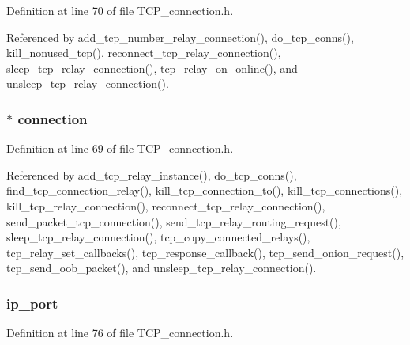 Definition at line 70 of file T\+C\+P\+\_\+connection.\+h.



Referenced by add\+\_\+tcp\+\_\+number\+\_\+relay\+\_\+connection(), do\+\_\+tcp\+\_\+conns(), kill\+\_\+nonused\+\_\+tcp(), reconnect\+\_\+tcp\+\_\+relay\+\_\+connection(), sleep\+\_\+tcp\+\_\+relay\+\_\+connection(), tcp\+\_\+relay\+\_\+on\+\_\+online(), and unsleep\+\_\+tcp\+\_\+relay\+\_\+connection().

\hypertarget{struct_t_c_p__con_a8ef08da0aa71c2a8a8d8bec587521844}{
\subsubsection[{connection}]{$\ast$ connection}}\label{struct_t_c_p__con_a8ef08da0aa71c2a8a8d8bec587521844}


Definition at line 69 of file T\+C\+P\+\_\+connection.\+h.



Referenced by add\+\_\+tcp\+\_\+relay\+\_\+instance(), do\+\_\+tcp\+\_\+conns(), find\+\_\+tcp\+\_\+connection\+\_\+relay(), kill\+\_\+tcp\+\_\+connection\+\_\+to(), kill\+\_\+tcp\+\_\+connections(), kill\+\_\+tcp\+\_\+relay\+\_\+connection(), reconnect\+\_\+tcp\+\_\+relay\+\_\+connection(), send\+\_\+packet\+\_\+tcp\+\_\+connection(), send\+\_\+tcp\+\_\+relay\+\_\+routing\+\_\+request(), sleep\+\_\+tcp\+\_\+relay\+\_\+connection(), tcp\+\_\+copy\+\_\+connected\+\_\+relays(), tcp\+\_\+relay\+\_\+set\+\_\+callbacks(), tcp\+\_\+response\+\_\+callback(), tcp\+\_\+send\+\_\+onion\+\_\+request(), tcp\+\_\+send\+\_\+oob\+\_\+packet(), and unsleep\+\_\+tcp\+\_\+relay\+\_\+connection().

\hypertarget{struct_t_c_p__con_a86e2a5a56c0dd22df6e8b8a10e40f9e4}{
\subsubsection[{ip\+\_\+port}]{ ip\+\_\+port}}\label{struct_t_c_p__con_a86e2a5a56c0dd22df6e8b8a10e40f9e4}


Definition at line 76 of file T\+C\+P\+\_\+connection.\+h.



